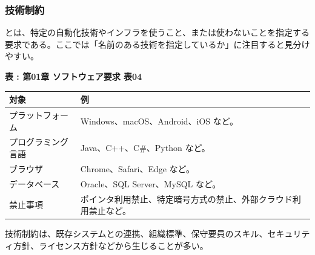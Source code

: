 \subsubsection{技術制約}

とは、特定の自動化技術やインフラを使うこと、または使わないことを指定する要求である。ここでは「名前のある技術を指定しているか」に注目すると見分けやすい。

\par\smallskip\noindent{}\label{tab:ch01-04}\textbf{表 \thetable: 第01章 ソフトウェア要求 表04}\par\smallskip
\begin{tabularx}{0.97\linewidth}{@{}p{.25\linewidth}X@{}}
\toprule
対象 & 例 \\
\midrule
プラットフォーム & Windows、macOS、Android、iOS など。 \\
プログラミング言語 & Java、C++、C\#、Python など。 \\
ブラウザ & Chrome、Safari、Edge など。 \\
データベース & Oracle、SQL Server、MySQL など。 \\
禁止事項 & ポインタ利用禁止、特定暗号方式の禁止、外部クラウド利用禁止など。 \\
\bottomrule
\end{tabularx}

技術制約は、既存システムとの連携、組織標準、保守要員のスキル、セキュリティ方針、ライセンス方針などから生じることが多い。
